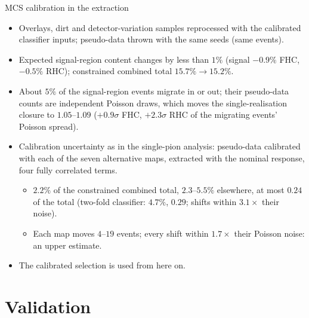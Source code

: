 \documentclass[aspectratio=169,10pt]{beamer}
\begin{document}
\begin{frame}{MCS calibration in the extraction}
  \begin{itemize}\small\setlength\itemsep{3pt}
    \item Overlays, dirt and detector-variation samples reprocessed with the calibrated classifier inputs;
          pseudo-data thrown with the same seeds (same events).
    \item Expected signal-region content changes by less than $1\%$ (signal $-0.9\%$ FHC, $-0.5\%$ RHC);
          constrained combined total $15.7\%\to15.2\%$.
    \item About $5\%$ of the signal-region events migrate in or out; their pseudo-data counts are independent
          Poisson draws, which moves the single-realisation closure to $1.05$--$1.09$
          ($+0.9\sigma$ FHC, $+2.3\sigma$ RHC of the migrating events' Poisson spread).
    \item Calibration uncertainty as in the single-pion analysis: pseudo-data calibrated with each of the seven
          alternative maps, extracted with the nominal response, four fully correlated terms.
    \begin{itemize}\small
      \item $2.2\%$ of the constrained combined total, $2.3$--$5.5\%$ elsewhere, at most $0.24$ of the total
            (two-fold classifier: $4.7\%$, $0.29$; shifts within $3.1\times$ their noise).
      \item Each map moves $4$--$19$ events; every shift within $1.7\times$ their Poisson noise: an upper estimate.
    \end{itemize}
    \item The calibrated selection is used from here on.
  \end{itemize}
\end{frame}

\section{Validation}
\end{document}

